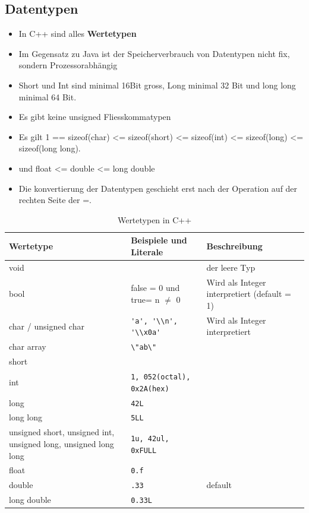 \subsection{Datentypen}
\begin{itemize}
	\item In C++ sind alles \textbf{Wertetypen}
	\item Im Gegensatz zu Java ist der Speicherverbrauch von Datentypen nicht fix, sondern Prozessorabhängig
	\item Short und Int sind minimal 16Bit gross, Long minimal 32 Bit und long long minimal 64 Bit.
	\item Es gibt keine unsigned Fliesskommatypen
	\item Es gilt 1 == sizeof(char) <= sizeof(short) <= sizeof(int) <= sizeof(long) <= sizeof(long long). 
	\item und float <= double <= long double
	\item Die konvertierung der Datentypen geschieht erst nach der Operation auf der rechten Seite der =.
\end{itemize}
\begin{table}[h]
	\centering
	\begin{tabu} to \linewidth {X l X}
		\toprule 
		Wertetype & Beispiele und Literale & Beschreibung \\
		\midrule
		void &  & der leere Typ \\
		bool & false = 0 und true= n $\neq$ 0  & Wird als Integer interpretiert (default = 1) \\
		char / unsigned char & \lstinline|'a', '\\n', '\\x0a'| & Wird als Integer interpretiert \\
		char array & \lstinline|\"ab\"| & \\
		short &  & \\
		int & \lstinline|1, 052(octal), 0x2A(hex)| &  \\
		long & \lstinline|42L| &  \\
		long long & \lstinline|5LL| &  \\
		unsigned short, \newline unsigned int, \newline unsigned long, \newline unsigned long long & \lstinline|1u, 42ul, 0xFULL| &  \\
		float & \lstinline|0.f|  &  \\
		double & \lstinline|.33| & default \\
		long double &  \lstinline|0.33L| &  \\
		\bottomrule 
	\end{tabu} 
	\caption{Wertetypen in C++}
\end{table}

